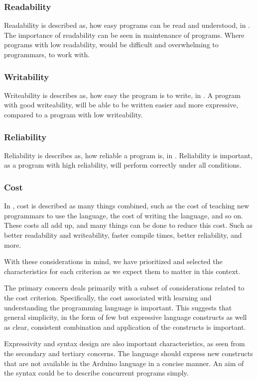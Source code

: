 \subsubsection{Readability}
Readability is described as, how easy programs can be read and understood, in . The importance of readability can be seen in maintenance of programs. Where programs with low readability, would be difficult and overwhelming to programmars, to work with. 
\subsubsection{Writability}
Writeability is describes as, how easy the program is to write, in . A program with good writeability, will be able to be written easier and more expressive, compared to a program with low writeability. 
\subsubsection{Reliability}
Reliability is describes as, how reliable a program is, in . Reliability is important, as a program with high reliability, will perform correctly under all conditions.
\subsubsection{Cost}
In , cost is described as many things combined, such as the cost of teaching new programmars to use the language, the cost of writing the language, and so on. These costs all add up, and many things can be done to reduce this cost. Such as better readability and writeability, faster compile times, better reliability, and more.


With these considerations in mind, we have prioritized and selected the characteristics for each criterion as we expect them to matter in this context.

The primary concern deals primarily with a subset of considerations related to the cost criterion. Specifically, the cost associated with learning and understanding the programming language is important. This suggests that general simplicity, in the form of few but expressive language constructs as well as clear, consistent combination and application of the constructs is important.

Expressivity and syntax design are also important characteristics, as seen from the secondary and tertiary concerns. The language should express new constructs that are not available in the Arduino language in a concise manner. An aim of the syntax could be to describe concurrent programs simply.


